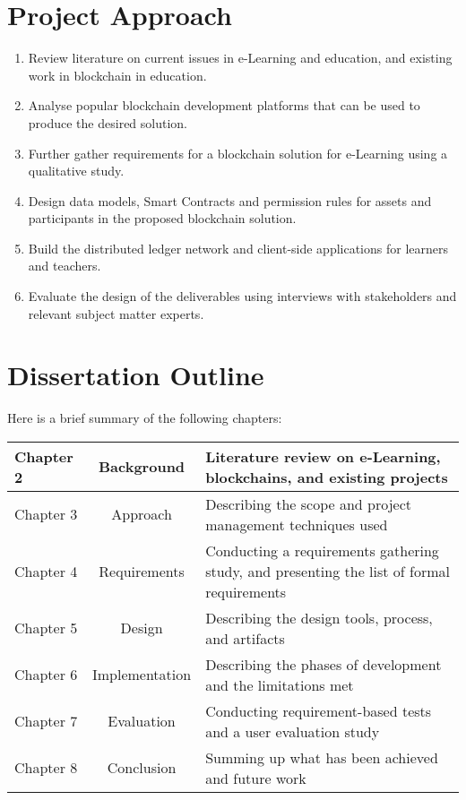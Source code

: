 \section{Project Approach} %

\begin{enumerate}
	\setlength\itemsep{0em}
	\item Review literature on current issues in e-Learning and education, and existing work in blockchain in education.
	\item Analyse popular blockchain development platforms that can be used to produce the desired solution.
	\item Further gather requirements for a blockchain solution for e-Learning using a qualitative study.
	\item Design data models, Smart Contracts and permission rules for assets and participants in the proposed blockchain solution.
	\item Build the distributed ledger network and client-side applications for learners and teachers.
	\item Evaluate the design of the deliverables using interviews with stakeholders and relevant subject matter experts.
\end{enumerate}

\section{Dissertation Outline}  %

Here is a brief summary of the following chapters:

\begin{table}[ht]
	\centering    
	\begin{tabularx}{\textwidth}{lcX}
		\toprule
		Chapter 2 & Background     & Literature review on e-Learning, blockchains, and existing projects                      \\
		\midrule
		Chapter 3 & Approach       & Describing the scope and project management techniques used\\
		\midrule
		Chapter 4 & Requirements   & Conducting a requirements gathering study, and presenting the list of formal requirements \\
		\midrule
		Chapter 5 & Design         & Describing the design tools, process, and artifacts                                      \\
		\midrule
		Chapter 6 & Implementation & Describing the phases of development and the limitations met                             \\
		\midrule
		Chapter 7 & Evaluation     & Conducting requirement-based tests and a user evaluation study                           \\
		\midrule
		Chapter 8 & Conclusion     & Summing up what has been achieved and future work                                        \\
		\bottomrule
	\end{tabularx}
\end{table}


